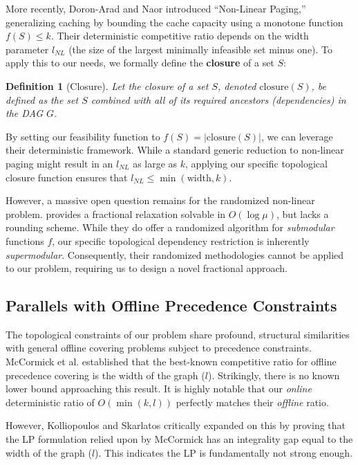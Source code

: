 \documentclass[a4paper,11pt]{article}
\newtheorem{definition}{Definition}
\begin{document}
More recently, Doron-Arad and Naor \cite{DoronAradetal2024} introduced ``Non-Linear Paging,'' generalizing caching by bounding the cache capacity using a monotone function $f(S) \le k$. Their deterministic competitive ratio depends on the width parameter $l_{NL}$ (the size of the largest minimally infeasible set minus one). 
To apply this to our needs, we formally define the \textbf{closure} of a set $S$:
\begin{definition}[Closure]
Let the closure of a set $S$, denoted $\text{closure}(S)$, be defined as the set $S$ combined with all of its required ancestors (dependencies) in the DAG $G$.
\end{definition}
By setting our feasibility function to $f(S) = |\text{closure}(S)|$, we can leverage their deterministic framework. While a standard generic reduction to non-linear paging might result in an $l_{NL}$ as large as $k$, applying our specific topological closure function ensures that $l_{NL} \le \min(\text{width}, k)$. 

However, a massive open question remains for the randomized non-linear problem. \cite{DoronAradetal2024} provides a fractional relaxation solvable in $O(\log \mu)$, but lacks a rounding scheme. While they do offer a randomized algorithm for \textit{submodular} functions $f$, our specific topological dependency restriction is inherently \textit{supermodular}. Consequently, their randomized methodologies cannot be applied to our problem, requiring us to design a novel fractional approach.

\subsection{Parallels with Offline Precedence Constraints}
The topological constraints of our problem share profound, structural similarities with general offline covering problems subject to precedence constraints. McCormick et al. \cite{mccormick2017primal} established that the best-known competitive ratio for offline precedence covering is the width of the graph ($l$). Strikingly, there is no known lower bound approaching this result. It is highly notable that our \textit{online} deterministic ratio of $O(\min(k, l))$ perfectly matches their \textit{offline} ratio. 

However, Kolliopoulos and Skarlatos \cite{kolliopoulos2023precedence} critically expanded on this by proving that the LP formulation relied upon by McCormick has an integrality gap equal to the width of the graph ($l$). This indicates the LP is fundamentally not strong enough.
\end{document}
